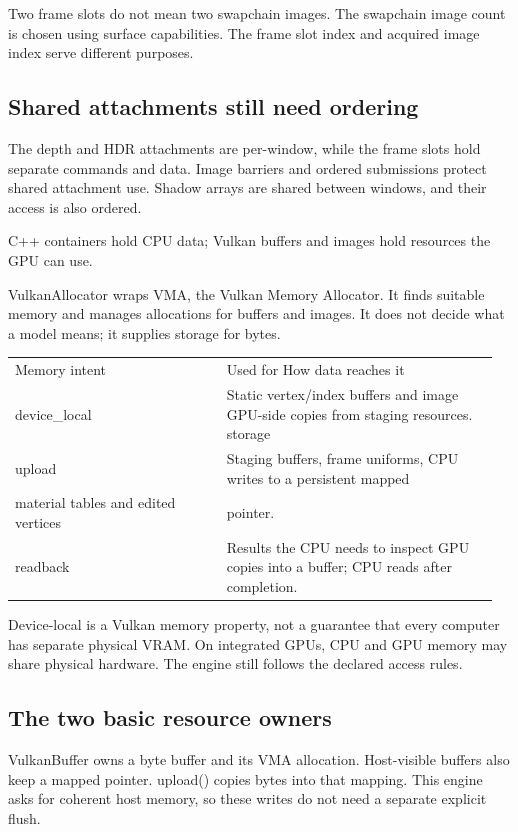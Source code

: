 \documentclass[11pt,a4paper]{article}
\begin{document}
Two frame slots do not mean two swapchain images. The swapchain image count is chosen using surface capabilities. The frame slot index and acquired image index serve different purposes.

\subsection*{Shared attachments still need ordering}
The depth and HDR attachments are per-window, while the frame slots hold separate commands and data. Image barriers and ordered submissions protect shared attachment use. Shadow arrays are shared between windows, and their access is also ordered.

\label{core-35}
C++ containers hold CPU data; Vulkan buffers and images hold resources the GPU can use.

VulkanAllocator wraps VMA, the Vulkan Memory Allocator. It finds suitable memory and manages allocations for buffers and images. It does not decide what a model means; it supplies storage for bytes.

{\small
\begin{longtable}{@{}p{0.42\linewidth}p{0.54\linewidth}@{}}
Memory intent & Used for                                     How data reaches it \\
device\_local & Static vertex/index buffers and image        GPU-side copies from staging resources. storage \\
upload & Staging buffers, frame uniforms,             CPU writes to a persistent mapped \\
material tables and edited vertices & pointer. \\
readback & Results the CPU needs to inspect             GPU copies into a buffer; CPU reads after completion. \\
\end{longtable}
}

Device-local is a Vulkan memory property, not a guarantee that every computer has separate physical VRAM. On integrated GPUs, CPU and GPU memory may share physical hardware. The engine still follows the declared access rules.

\subsection*{The two basic resource owners}
VulkanBuffer owns a byte buffer and its VMA allocation. Host-visible buffers also keep a mapped pointer. upload() copies bytes into that mapping. This engine asks for coherent host memory, so these writes do not need a separate explicit flush.
\end{document}
